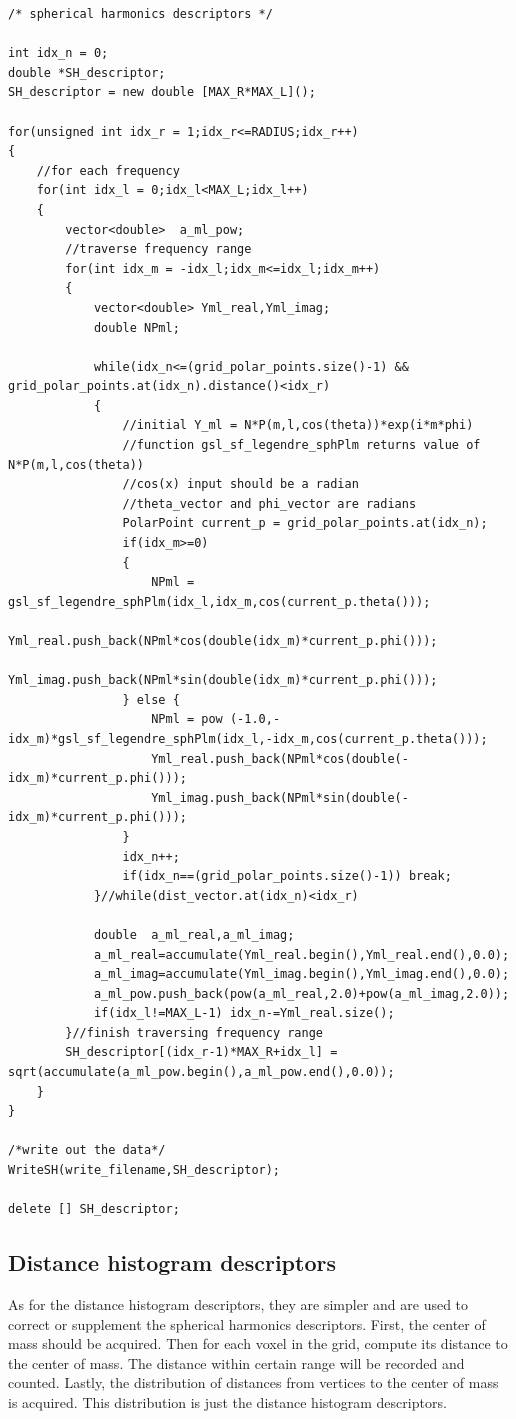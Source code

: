 \begin{lstlisting}[xleftmargin=1em]
/* spherical harmonics descriptors */

int idx_n = 0;
double *SH_descriptor;
SH_descriptor = new double [MAX_R*MAX_L]();

for(unsigned int idx_r = 1;idx_r<=RADIUS;idx_r++)
{
	//for each frequency
	for(int idx_l = 0;idx_l<MAX_L;idx_l++)
	{
		vector<double> 	a_ml_pow;
		//traverse frequency range
		for(int idx_m = -idx_l;idx_m<=idx_l;idx_m++)
		{
			vector<double> Yml_real,Yml_imag;
			double NPml;

			while(idx_n<=(grid_polar_points.size()-1) && grid_polar_points.at(idx_n).distance()<idx_r)
			{
				//initial Y_ml = N*P(m,l,cos(theta))*exp(i*m*phi)
				//function gsl_sf_legendre_sphPlm returns value of N*P(m,l,cos(theta))
				//cos(x) input should be a radian
				//theta_vector and phi_vector are radians
				PolarPoint current_p = grid_polar_points.at(idx_n);
				if(idx_m>=0)
				{
					NPml = gsl_sf_legendre_sphPlm(idx_l,idx_m,cos(current_p.theta()));
					Yml_real.push_back(NPml*cos(double(idx_m)*current_p.phi()));
					Yml_imag.push_back(NPml*sin(double(idx_m)*current_p.phi()));
				} else {
					NPml = pow (-1.0,-idx_m)*gsl_sf_legendre_sphPlm(idx_l,-idx_m,cos(current_p.theta()));
					Yml_real.push_back(NPml*cos(double(-idx_m)*current_p.phi()));
					Yml_imag.push_back(NPml*sin(double(-idx_m)*current_p.phi()));
				}
				idx_n++;
				if(idx_n==(grid_polar_points.size()-1)) break;
			}//while(dist_vector.at(idx_n)<idx_r)

			double 	a_ml_real,a_ml_imag;
			a_ml_real=accumulate(Yml_real.begin(),Yml_real.end(),0.0);
			a_ml_imag=accumulate(Yml_imag.begin(),Yml_imag.end(),0.0);
			a_ml_pow.push_back(pow(a_ml_real,2.0)+pow(a_ml_imag,2.0));
			if(idx_l!=MAX_L-1) idx_n-=Yml_real.size();
		}//finish traversing frequency range
		SH_descriptor[(idx_r-1)*MAX_R+idx_l] = sqrt(accumulate(a_ml_pow.begin(),a_ml_pow.end(),0.0));
	}
}

/*write out the data*/
WriteSH(write_filename,SH_descriptor);

delete [] SH_descriptor;
\end{lstlisting}


\subsection{Distance histogram descriptors}

As for the distance histogram descriptors, they are simpler and are used to correct or supplement the spherical harmonics descriptors. First, the center of mass should be acquired. Then for each voxel in the grid, compute its distance to the center of mass. The distance within certain range will be recorded and counted. Lastly, the 
distribution of distances from vertices to the center of mass is acquired. This distribution is just the distance histogram descriptors.  

